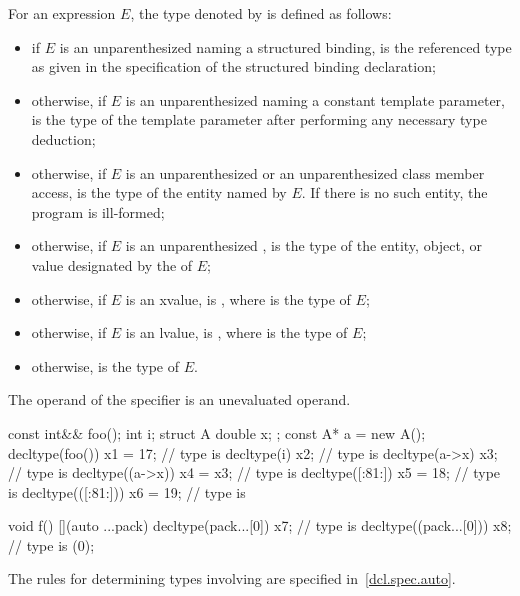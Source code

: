 \pnum
{}%
For an expression $E$, the type denoted by  is defined as follows:
\begin{itemize}
\item if $E$ is an unparenthesized 
naming a structured binding,
 is the referenced type as given in
the specification of the structured binding declaration;

\item otherwise, if $E$ is an unparenthesized 
naming a constant template parameter,
 is the type of the template parameter
after performing any necessary
type deduction;

\item otherwise, if $E$ is an unparenthesized  or
an unparenthesized
class
member access,  is the
type of the entity named by $E$.
If there is no such entity, the program is ill-formed;

\item otherwise, if $E$ is an unparenthesized ,
 is the type of the entity, object, or value
designated by the  of $E$;

\item otherwise, if $E$ is
an xvalue,  is , where  is the type
of $E$;

\item otherwise, if $E$ is an lvalue, 
is , where  is the type of $E$;

\item otherwise,  is the type of $E$.
\end{itemize}

The operand of the  specifier is an unevaluated
operand.

\begin{example}
\begin{codeblock}
const int&& foo();
int i;
struct A { double x; };
const A* a = new A();
decltype(foo()) x1 = 17;        // type is 
decltype(i) x2;                 // type is 
decltype(a->x) x3;              // type is 
decltype((a->x)) x4 = x3;       // type is 
decltype([:^^x1:]) x5 = 18;     // type is 
decltype(([:^^x1:])) x6 = 19;   // type is 

void f() {
  [](auto ...pack) {
    decltype(pack...[0]) x7;    // type is 
    decltype((pack...[0])) x8;  // type is 
  }(0);
}
\end{codeblock}
\end{example}
\begin{note}
The rules for determining types involving  are specified
in~\ref{dcl.spec.auto}.
\end{note}

